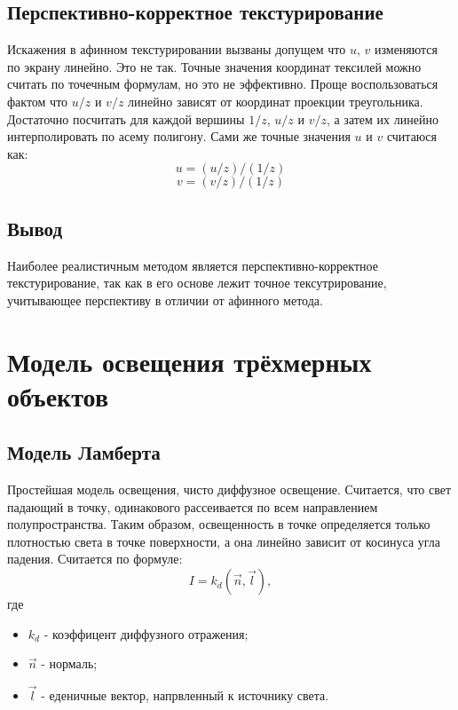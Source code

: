 \documentclass[12pt,a4paper,oneside]{report}
\begin{document}
			\subsection{Перспективно-корректное текстурирование}
				\quad Искажения в афинном текстурировании вызваны допущем что $u$, $v$ изменяются по экрану линейно. Это не так. Точные значения координат тексилей можно считать по точечным формулам, но это не эффективно. Проще воспользоваться фактом что $u/z$ и $v/z$ линейно зависят от координат проекции треугольника. Достаточно посчитать для каждой вершины $1/z$, $u/z$ и $v/z$, а затем их линейно интерполировать по асему полигону. Сами же точные значения $u$ и $v$ считаюся как: \[ u=(u/z)/(1/z) \] \[ v=(v/z)/(1/z) \]
			\subsection{Вывод}
				\quad Наиболее реалистичным методом является перспективно-корректное текстурирование, так как в его основе лежит точное тексутрирование, учитывающее перспективу в отличии от афинного метода.
		\section{Модель освещения трёхмерных объектов}
			\subsection{Модель Ламберта}
				\quad Простейшая модель освещения, чисто диффузное освещение. Считается, что свет падающий в точку, одинакового рассеивается по всем направлением полупространства. Таким образом, освещенность в точке определяется только плотностью света в точке поверхности, а она линейно зависит от косинуса угла падения. Считается по формуле:
				\[
					I = k_{d}(\vec{n}, \vec{l}),
				\]
				\quad где
				\begin{itemize}
					\item $k_{d}$ - коэффицент диффузного отражения;
					\item $\vec{n}$ -  нормаль;
					\item $\vec{l}$ - еденичные вектор, напрвленный к источнику света.
				\end{itemize}
\end{document}
